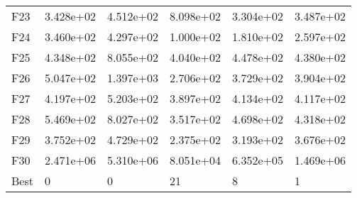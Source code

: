 \begin{tabular}{llllll}
F23  &  3.428e+02 &  4.512e+02 &  8.098e+02 &  3.304e+02 &  3.487e+02 \\
F24  &  3.460e+02 &  4.297e+02 &  1.000e+02 &  1.810e+02 &  2.597e+02 \\
F25  &  4.348e+02 &  8.055e+02 &  4.040e+02 &  4.478e+02 &  4.380e+02 \\
F26  &  5.047e+02 &  1.397e+03 &  2.706e+02 &  3.729e+02 &  3.904e+02 \\
F27  &  4.197e+02 &  5.203e+02 &  3.897e+02 &  4.134e+02 &  4.117e+02 \\
F28  &  5.469e+02 &  8.027e+02 &  3.517e+02 &  4.698e+02 &  4.318e+02 \\
F29  &  3.752e+02 &  4.729e+02 &  2.375e+02 &  3.193e+02 &  3.676e+02 \\
F30  &  2.471e+06 &  5.310e+06 &  8.051e+04 &  6.352e+05 &  1.469e+06 \\
Best &          0 &          0 &         21 &          8 &          1 \\
\bottomrule
\end{tabular}
